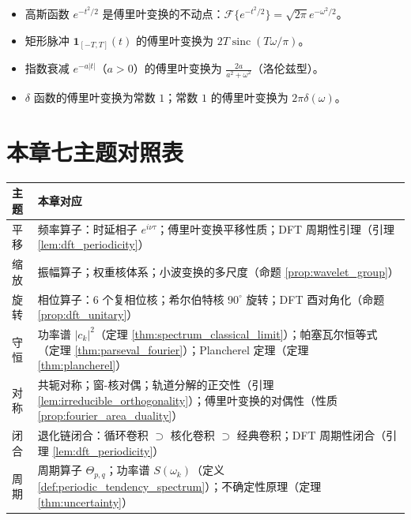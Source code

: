 \begin{example}[常用函数的傅里叶变换]\label{ex:fourier_transform_examples}
\begin{itemize}
    \item 高斯函数 $e^{-t^2/2}$ 是傅里叶变换的不动点：$\mathcal{F}\{e^{-t^2/2}\}=\sqrt{2\pi}e^{-\omega^2/2}$。
    \item 矩形脉冲 $\mathbf{1}_{[-T,T]}(t)$ 的傅里叶变换为 $2T\operatorname{sinc}(T\omega/\pi)$。
    \item 指数衰减 $e^{-a|t|}$（$a>0$）的傅里叶变换为 $\frac{2a}{a^2+\omega^2}$（洛伦兹型）。
    \item $\delta$ 函数的傅里叶变换为常数 $1$；常数 $1$ 的傅里叶变换为 $2\pi\delta(\omega)$。
\end{itemize}
\end{example}

\section*{本章七主题对照表}

\begin{center}
\renewcommand{\arraystretch}{1.3}
\begin{tabular}{>{\centering\arraybackslash}p{2.2cm}>{\centering\arraybackslash}p{10.5cm}}
\toprule
主题 & 本章对应 \\
\midrule
平移 & 频率算子：时延相子 $e^{i\nu\tau}$；傅里叶变换平移性质；DFT 周期性引理（引理 \ref{lem:dft_periodicity}） \\
缩放 & 振幅算子；权重核体系；小波变换的多尺度（命题 \ref{prop:wavelet_group}） \\
旋转 & 相位算子：6 个复相位核；希尔伯特核 $90^\circ$ 旋转；DFT 酉对角化（命题 \ref{prop:dft_unitary}） \\
守恒 & 功率谱 $|c_k|^2$（定理 \ref{thm:spectrum_classical_limit}）；帕塞瓦尔恒等式（定理 \ref{thm:parseval_fourier}）；Plancherel 定理（定理 \ref{thm:plancherel}） \\
对称 & 共轭对称；窗-核对偶；轨道分解的正交性（引理 \ref{lem:irreducible_orthogonality}）；傅里叶变换的对偶性（性质 \ref{prop:fourier_area_duality}） \\
闭合 & 退化链闭合：循环卷积 $\supset$ 核化卷积 $\supset$ 经典卷积；DFT 周期性闭合（引理 \ref{lem:dft_periodicity}） \\
周期 & 周期算子 $\Theta_{p,q}$；功率谱 $S(\omega_k)$（定义 \ref{def:periodic_tendency_spectrum}）；不确定性原理（定理 \ref{thm:uncertainty}） \\
\bottomrule
\end{tabular}
\end{center}


